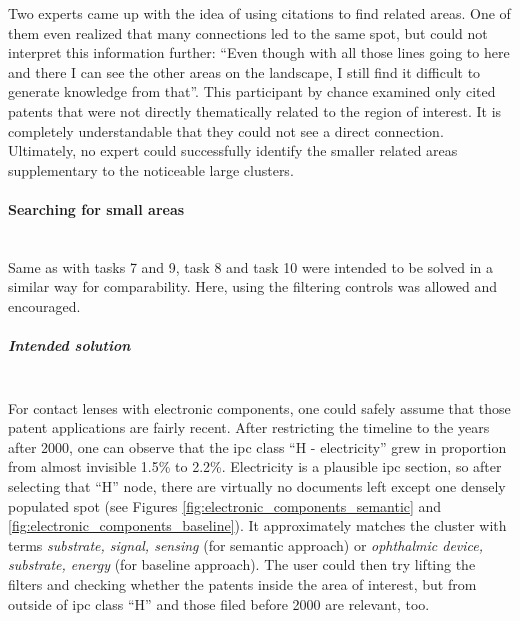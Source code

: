 Two experts came up with the idea of using citations to find related areas.
One of them even realized that many connections led to the same spot, but could not interpret this information further: ``Even though with all those lines going to here and there I can see the other areas on the landscape, I still find it difficult to generate knowledge from that''.
This participant by chance examined only cited patents that were not directly thematically related to the region of interest.
It is completely understandable that they could not see a direct connection.
Ultimately, no expert could successfully identify the smaller related areas supplementary to the noticeable large clusters.

\paragraph{Searching for small areas}~\\
Same as with tasks 7 and 9, task 8 and task 10 were intended to be solved in a similar way for comparability.
Here, using the filtering controls was allowed and encouraged.

\subparagraph{Intended solution}~\\
For contact lenses with electronic components, one could safely assume that those patent applications are fairly recent.
After restricting the timeline to the years after 2000, one can observe that the \gls{ipc} class ``H - electricity'' grew in proportion from almost invisible 1.5\% to 2.2\%.
Electricity is a plausible \gls{ipc} section, so after selecting that ``H'' node, there are virtually no documents left except one densely populated spot (see Figures \autoref{fig:electronic_components_semantic} and \autoref{fig:electronic_components_baseline}).
It approximately matches the cluster  with terms \textit{substrate, signal, sensing} (for semantic approach) or \textit{ophthalmic device, substrate, energy} (for baseline approach). 
The user could then try lifting the filters and checking whether the patents inside the area of interest, but from outside of \gls{ipc} class ``H'' and those filed before 2000 are relevant, too.

